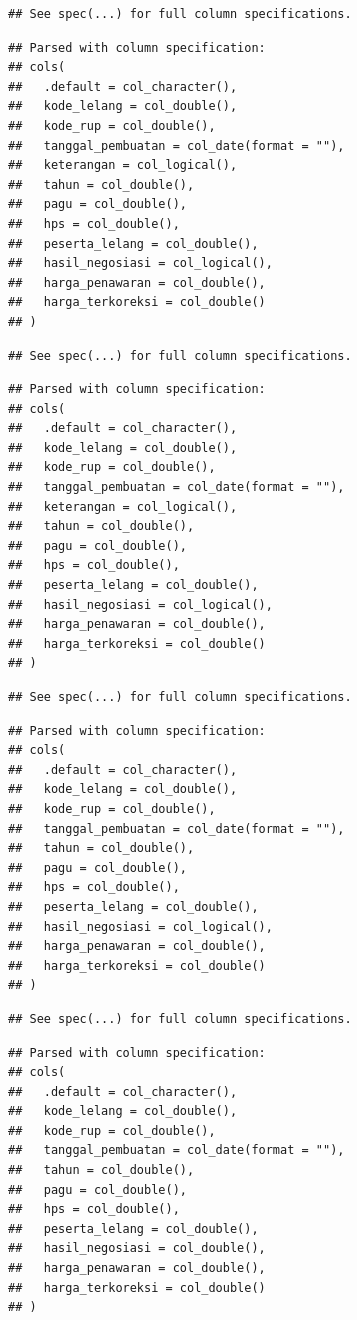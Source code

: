 \documentclass[]{book}
\begin{document}
\begin{verbatim}
## See spec(...) for full column specifications.
\end{verbatim}

\begin{verbatim}
## Parsed with column specification:
## cols(
##   .default = col_character(),
##   kode_lelang = col_double(),
##   kode_rup = col_double(),
##   tanggal_pembuatan = col_date(format = ""),
##   keterangan = col_logical(),
##   tahun = col_double(),
##   pagu = col_double(),
##   hps = col_double(),
##   peserta_lelang = col_double(),
##   hasil_negosiasi = col_logical(),
##   harga_penawaran = col_double(),
##   harga_terkoreksi = col_double()
## )
\end{verbatim}

\begin{verbatim}
## See spec(...) for full column specifications.
\end{verbatim}

\begin{verbatim}
## Parsed with column specification:
## cols(
##   .default = col_character(),
##   kode_lelang = col_double(),
##   kode_rup = col_double(),
##   tanggal_pembuatan = col_date(format = ""),
##   keterangan = col_logical(),
##   tahun = col_double(),
##   pagu = col_double(),
##   hps = col_double(),
##   peserta_lelang = col_double(),
##   hasil_negosiasi = col_logical(),
##   harga_penawaran = col_double(),
##   harga_terkoreksi = col_double()
## )
\end{verbatim}

\begin{verbatim}
## See spec(...) for full column specifications.
\end{verbatim}

\begin{verbatim}
## Parsed with column specification:
## cols(
##   .default = col_character(),
##   kode_lelang = col_double(),
##   kode_rup = col_double(),
##   tanggal_pembuatan = col_date(format = ""),
##   tahun = col_double(),
##   pagu = col_double(),
##   hps = col_double(),
##   peserta_lelang = col_double(),
##   hasil_negosiasi = col_logical(),
##   harga_penawaran = col_double(),
##   harga_terkoreksi = col_double()
## )
\end{verbatim}

\begin{verbatim}
## See spec(...) for full column specifications.
\end{verbatim}

\begin{verbatim}
## Parsed with column specification:
## cols(
##   .default = col_character(),
##   kode_lelang = col_double(),
##   kode_rup = col_double(),
##   tanggal_pembuatan = col_date(format = ""),
##   tahun = col_double(),
##   pagu = col_double(),
##   hps = col_double(),
##   peserta_lelang = col_double(),
##   hasil_negosiasi = col_double(),
##   harga_penawaran = col_double(),
##   harga_terkoreksi = col_double()
## )
\end{verbatim}
\end{document}
